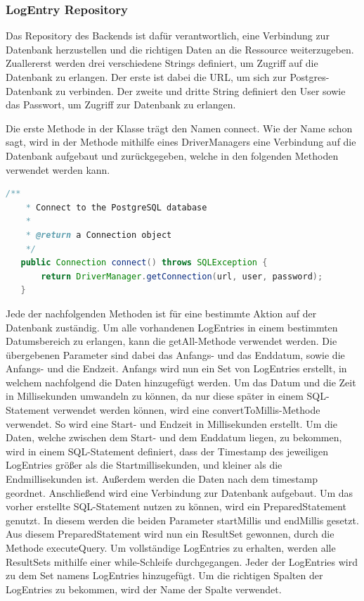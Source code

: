 \subsubsection{LogEntry Repository}
Das Repository des Backends ist dafür verantwortlich, eine Verbindung zur Datenbank herzustellen und die richtigen Daten an die Ressource weiterzugeben. Zuallererst werden drei verschiedene Strings definiert, um Zugriff auf die Datenbank zu erlangen. Der erste ist dabei die URL, um sich zur Postgres-Datenbank zu verbinden. Der zweite und dritte String definiert den User sowie das Passwort, um Zugriff zur Datenbank zu erlangen.
 
Die erste Methode in der Klasse trägt den Namen connect. Wie der Name schon sagt, wird in der Methode mithilfe eines DriverManagers eine Verbindung auf die Datenbank aufgebaut und zurückgegeben, welche in den folgenden Methoden verwendet werden kann.
 
\begin{lstlisting}[language=java,caption=Connect to SQL Database,label=lst:impl:connect]
    /**
    * Connect to the PostgreSQL database
    *
    * @return a Connection object
    */
   public Connection connect() throws SQLException {
       return DriverManager.getConnection(url, user, password);
   }  
\end{lstlisting}
 
Jede der nachfolgenden Methoden ist für eine bestimmte Aktion auf der Datenbank zuständig.
Um alle vorhandenen LogEntries in einem bestimmten Datumsbereich zu erlangen, kann die getAll-Methode verwendet werden. Die übergebenen Parameter sind dabei das Anfangs- und das Enddatum, sowie die Anfangs- und die Endzeit. Anfangs wird nun ein Set von LogEntries erstellt, in welchem nachfolgend die Daten hinzugefügt werden. Um das Datum und die Zeit in Millisekunden umwandeln zu können, da nur diese später in einem SQL-Statement verwendet werden können, wird eine convertToMillis-Methode verwendet. So wird eine Start- und Endzeit in Millisekunden erstellt.
Um die Daten, welche zwischen dem Start- und dem Enddatum liegen, zu bekommen, wird in einem SQL-Statement definiert, dass der Timestamp des jeweiligen LogEntries größer als die Startmillisekunden, und kleiner als die Endmillisekunden ist. Außerdem werden die Daten nach dem timestamp geordnet. Anschließend wird eine Verbindung zur Datenbank aufgebaut. Um das vorher erstellte SQL-Statement nutzen zu können, wird ein PreparedStatement genutzt. In diesem werden die beiden Parameter startMillis und endMillis gesetzt. Aus diesem PreparedStatement wird nun ein ResultSet gewonnen, durch die Methode executeQuery. Um vollständige LogEntries zu erhalten, werden alle ResultSets mithilfe einer while-Schleife durchgegangen. Jeder der LogEntries wird zu dem Set namens LogEntries hinzugefügt. Um die richtigen Spalten der LogEntries zu bekommen, wird der Name der Spalte verwendet.
 
